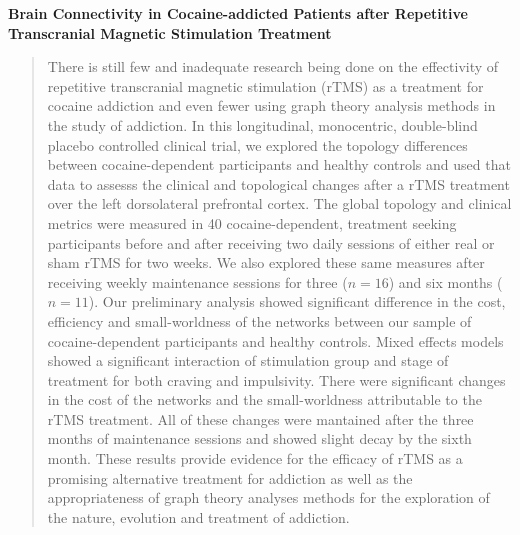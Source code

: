 \begin{center}
    \large\textbf{Brain Connectivity in Cocaine-addicted Patients after Repetitive Transcranial Magnetic Stimulation Treatment}
\end{center}
\begin{quotation}
    \noindent
    There is still few and inadequate research being done on the effectivity of repetitive transcranial magnetic stimulation (rTMS) as a treatment for cocaine addiction and even fewer using graph theory analysis methods in the study of addiction. In this longitudinal, monocentric, double-blind placebo controlled clinical trial, we explored the topology differences between cocaine-dependent participants and healthy controls and used that data to assesss the clinical and topological changes after a rTMS treatment over the left dorsolateral prefrontal cortex. The global topology and clinical metrics were measured in 40 cocaine-dependent, treatment seeking participants before and after receiving two daily sessions of either real or sham rTMS for two weeks. We also explored these same measures after receiving weekly maintenance sessions for three ($n=16$) and  six months ($n=11$). Our preliminary analysis showed significant difference in the cost, efficiency and small-worldness of the networks between our sample of cocaine-dependent participants and healthy controls. Mixed effects models showed a significant interaction of stimulation group and stage of treatment for both craving and impulsivity. There were significant changes in the cost of the networks and the small-worldness attributable to the rTMS treatment. All of these changes were mantained after the three months of maintenance sessions and showed slight decay by the sixth month. These results provide evidence for the efficacy of rTMS as a promising alternative treatment for addiction as well as the appropriateness of graph theory analyses methods for the exploration of the nature, evolution and treatment of addiction.
\end{quotation}
\clearpage
{}
